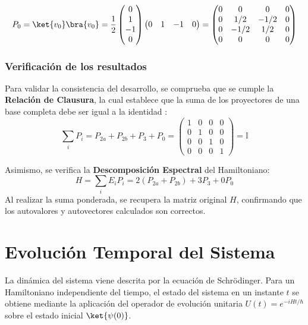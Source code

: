 \documentclass[11pt,a4paper,spanish]{book}
\begin{document}
\begin{equation}
P_{0} = \ket{v_{0}}\bra{v_{0}} = \frac{1}{2}
\begin{pmatrix} 0 \\ 1 \\ -1 \\ 0 \end{pmatrix}
\begin{pmatrix} 0 & 1 & -1 & 0 \end{pmatrix} =
\begin{pmatrix} 
0 & 0 & 0 & 0 \\ 
0 & 1/2 & -1/2 & 0 \\ 
0 & -1/2 & 1/2 & 0 \\ 
0 & 0 & 0 & 0 
\end{pmatrix}
\end{equation}

\subsubsection{Verificación de los resultados}

Para validar la consistencia del desarrollo, se comprueba que se cumple la \textbf{Relación de Clausura}, la cual establece que la suma de los proyectores de una base completa debe ser igual a la identidad \citep{vonneumann1932}:
\begin{equation}
\sum_{i} P_i = P_{2a} + P_{2b} + P_3 + P_0 = 
\begin{pmatrix} 
1 & 0 & 0 & 0 \\ 
0 & 1 & 0 & 0 \\ 
0 & 0 & 1 & 0 \\ 
0 & 0 & 0 & 1 
\end{pmatrix} = \mathbb{I}
\end{equation}

Asimismo, se verifica la \textbf{Descomposición Espectral} del Hamiltoniano:
\begin{equation}
H = \sum_{i} E_i P_i = 2(P_{2a} + P_{2b}) + 3P_3 + 0P_0
\end{equation}
Al realizar la suma ponderada, se recupera la matriz original $H$, confirmando que los autovalores y autovectores calculados son correctos.

\section{Evolución Temporal del Sistema}

La dinámica del sistema viene descrita por la ecuación de Schrödinger. Para un Hamiltoniano independiente del tiempo, el estado del sistema en un instante $t$ se obtiene mediante la aplicación del operador de evolución unitaria $U(t) = e^{-iHt/\hbar}$ sobre el estado inicial $\ket{\psi(0)}$\citep{schrodinger1926}.
\end{document}
